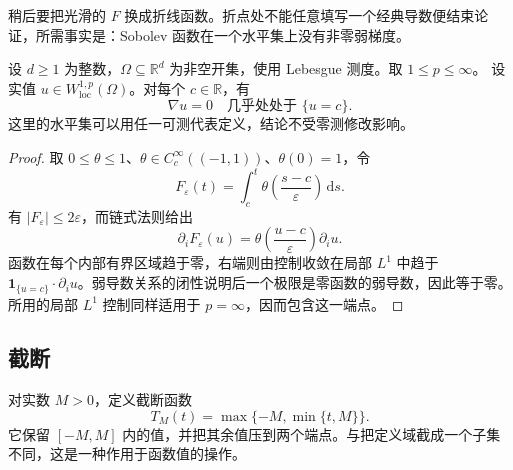 \ProseParagraphBreak

稍后要把光滑的 \(F\) 换成折线函数。折点处不能任意填写一个经典导数便结束论证，所需事实是：Sobolev 函数在一个水平集上没有非零弱梯度。

\begin{proposition}\label{b1:prop:sobolev-gradient-on-level-sets}
设 \(d\geq1\) 为整数，\(\Omega\subseteq\mathbb R^d\) 为非空开集，使用 Lebesgue 测度。取 \(1\leq p\leq\infty\)。
设实值 \(u\in W^{1,p}_{\mathrm{loc}}(\Omega)\)。对每个 \(c\in\mathbb R\)，有
\[
 \nabla u=0\quad\text{几乎处处于 }\{u=c\}.
\]
这里的水平集可以用任一可测代表定义，结论不受零测修改影响。
\end{proposition}
\begin{proof}
取 \(0\le\theta\le1\)、\(\theta\in C_c^\infty((-1,1))\)、\(\theta(0)=1\)，令
\[
 F_\varepsilon(t)=\int_c^t\theta\left(\frac{s-c}{\varepsilon}\right)\,\mathrm ds.
\]
有 \(|F_\varepsilon|\le2\varepsilon\)，而链式法则给出
\[
 \partial_i F_\varepsilon(u)
 =\theta\left(\frac{u-c}{\varepsilon}\right)\partial_i u.
\]
函数在每个内部有界区域趋于零，右端则由控制收敛在局部 \(L^1\) 中趋于 \(\mathbf1_{\{u=c\}}\cdot\partial_i u\)。弱导数关系的闭性说明后一个极限是零函数的弱导数，因此等于零。所用的局部 \(L^1\) 控制同样适用于 \(p=\infty\)，因而包含这一端点。
\end{proof}

\subsection{截断}
\label{b1:subsec:210303}

对实数 \(M>0\)，定义截断函数
\[
 T_M(t)=\max\{-M,\min\{t,M\}\}.
\]
它保留 \([-M,M]\) 内的值，并把其余值压到两个端点。与把定义域截成一个子集不同，这是一种作用于函数值的操作。

